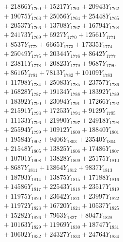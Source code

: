 \documentclass[a4paper,10pt]{article}
\begin{document}
{\begin{align}
&\;  + 21866 Y_{1760} + 15217 Y_{1761} + 20943 Y_{1762} \\[0.3ex]
&\;  + 19075 Y_{1763} + 25056 Y_{1764} + 25448 Y_{1765} \\[0.3ex]
&\;  + 20537 Y_{1766} + 13708 Y_{1767} + 16794 Y_{1768} \\[0.5ex]\allowbreak
&\;  + 24173 Y_{1769} + 6927 Y_{1770} + 12561 Y_{1771} \\[0.3ex]
&\;  + 8537 Y_{1772} + 6665 Y_{1773} + 17335 Y_{1774} \\[0.3ex]
&\;  + 25049 Y_{1775} + 20344 Y_{1776} + 8642 Y_{1777} \\[0.3ex]
&\;  + 23811 Y_{1778} + 20823 Y_{1779} + 9687 Y_{1780} \\[0.3ex]
&\;  + 8616 Y_{1781} + 7813 Y_{1782} + 10109 Y_{1783} \\[0.3ex]
&\;  + 11798 Y_{1784} + 25083 Y_{1785} + 23757 Y_{1786} \\[0.3ex]
&\;  + 16828 Y_{1787} + 19134 Y_{1788} + 18392 Y_{1789} \\[0.3ex]
&\;  + 18392 Y_{1790} + 23094 Y_{1791} + 17266 Y_{1792} \\[0.3ex]
&\;  + 21591 Y_{1793} + 17253 Y_{1794} + 9129 Y_{1795} \\[0.3ex]
&\;  + 11133 Y_{1796} + 21990 Y_{1797} + 24918 Y_{1798} \\[0.5ex]\allowbreak
&\;  + 25594 Y_{1799} + 10912 Y_{1800} + 18840 Y_{1801} \\[0.3ex]
&\;  + 19584 Y_{1802} + 9406 Y_{1803} + 23540 Y_{1804} \\[0.3ex]
&\;  + 21548 Y_{1805} + 13825 Y_{1806} + 17486 Y_{1807} \\[0.3ex]
&\;  + 10701 Y_{1808} + 13828 Y_{1809} + 25175 Y_{1810} \\[0.3ex]
&\;  + 8687 Y_{1811} + 13864 Y_{1812} + 9837 Y_{1813} \\[0.3ex]
&\;  + 18793 Y_{1814} + 13875 Y_{1815} + 17188 Y_{1816} \\[0.3ex]
&\;  + 14586 Y_{1817} + 22543 Y_{1818} + 23517 Y_{1819} \\[0.3ex]
&\;  + 11975 Y_{1820} + 23642 Y_{1821} + 23997 Y_{1822} \\[0.3ex]
&\;  + 11972 Y_{1823} + 16720 Y_{1824} + 10537 Y_{1825} \\[0.3ex]
&\;  + 15282 Y_{1826} + 7963 Y_{1827} + 8047 Y_{1828} \\[0.5ex]\allowbreak
&\;  + 10163 Y_{1829} + 11969 Y_{1830} + 18747 Y_{1831} \\[0.3ex]
&\;  + 10602 Y_{1832} + 24327 Y_{1833} + 24764 Y_{1834} \\[0.3ex]

\end{align}}
\end{document}
